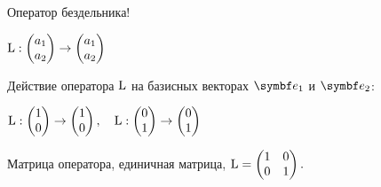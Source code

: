 \begin{frame}{Оператор бездельника!}


$\operatorname{L} : \begin{pmatrix}
  a_1 \\
  a_2 \\
\end{pmatrix} \to 
\begin{pmatrix}
  a_1 \\
  a_2 \\
\end{pmatrix}$

\pause

Действие оператора $\operatorname{L}$ на базисных векторах $\be_1$ и $\be_2$:

$\operatorname{L} : \begin{pmatrix}
  1 \\
  0 \\
\end{pmatrix} \to 
\begin{pmatrix}
1  \\
0  \\
\end{pmatrix}, \quad
\operatorname{L} : \begin{pmatrix}
  0 \\
  1 \\
\end{pmatrix} \to 
\begin{pmatrix}
0 \\
1 \\
\end{pmatrix}$

\pause

Матрица оператора, \alert{единичная матрица}, $\operatorname{L} = 
\begin{pmatrix}
  1 & 0  \\
  0 & 1 \\
\end{pmatrix}.$



\end{frame}
    



